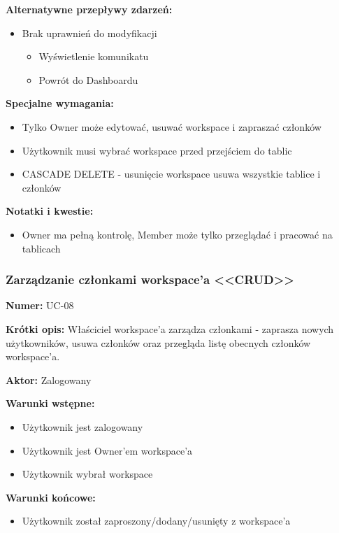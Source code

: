 \documentclass[12pt,a4paper]{article}
\begin{document}
\textbf{Alternatywne przepływy zdarzeń:}
\begin{itemize}[leftmargin=*]
    \item [CRUD] Brak uprawnień do modyfikacji
    \begin{itemize}
    \item Wyświetlenie komunikatu
    \item Powrót do Dashboardu
    \end{itemize}
\end{itemize}

\textbf{Specjalne wymagania:}
\begin{itemize}
    \item Tylko Owner może edytować, usuwać workspace i zapraszać członków
    \item Użytkownik musi wybrać workspace przed przejściem do tablic
    \item CASCADE DELETE - usunięcie workspace usuwa wszystkie tablice i członków
\end{itemize}

\textbf{Notatki i kwestie:} \begin{itemize}
    \item Owner ma pełną kontrolę, Member może tylko przeglądać i pracować na tablicach
\end{itemize}

\subsubsection{Zarządzanie członkami workspace'a <<CRUD>>}

\textbf{Numer:} UC-08

\textbf{Krótki opis:} Właściciel workspace'a zarządza członkami - zaprasza nowych użytkowników, usuwa członków oraz przegląda listę obecnych członków workspace'a.

\textbf{Aktor:} Zalogowany

\textbf{Warunki wstępne:}
\begin{itemize}[leftmargin=*]
    \item Użytkownik jest zalogowany
    \item Użytkownik jest Owner'em workspace'a
    \item Użytkownik wybrał workspace
\end{itemize}

\textbf{Warunki końcowe:}
\begin{itemize}[leftmargin=*]
    \item Użytkownik został zaproszony/dodany/usunięty z workspace'a
\end{itemize}
\end{document}
